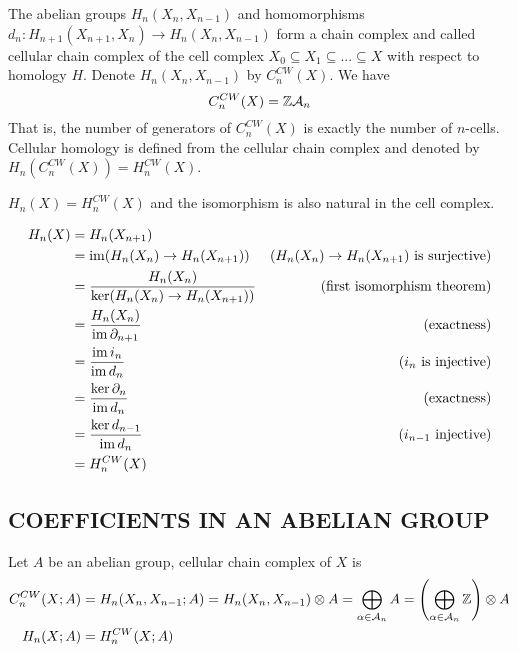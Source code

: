 \documentclass{report}
\begin{document}
\begin{definition}
    The abelian groups $H_n(X_n, X_{n-1})$ and homomorphisms $d_n: H_{n+1}(X_{n+1}, X_n) \to H_n(X_n, X_{n-1})$ form a chain complex and called cellular chain complex of the cell complex $X_0 \subseteq X_1 \subseteq ... \subseteq X$ with respect to homology $H$. Denote $H_n(X_n, X_{n-1})$ by $C^{CW}_n(X)$. We have
    $$
        C^{CW}_n(X) = \Z \mathcal{A}_n
    $$
    That is, the number of generators of $C^{CW}_n(X)$ is exactly the number of $n$-cells. Cellular homology is defined from the cellular chain complex and denoted by $H_n(C^{CW}_n(X)) = H^{CW}_n(X)$.
\end{definition}

\begin{theorem}
    $H_n(X) = H^{CW}_n(X)$ and the isomorphism is also natural in the cell complex.
\end{theorem}

\begin{longproof}
    \begin{align*}
        H_n(X)
        &= H_n(X_{n+1}) \\
        &= \im (H_n(X_n) \to H_n(X_{n+1})) &\text{($H_n(X_n) \to H_n(X_{n+1})$ is surjective)}\\
        &= \frac{H_n(X_n)}{\ker (H_n(X_n) \to H_n(X_{n+1}))} &\text{(first isomorphism theorem)} \\ 
        &= \frac{H_n(X_n)}{\im \partial_{n+1}} &\text{(exactness)} \\ 
        &= \frac{\im i_n}{\im d_n} &\text{($i_n$ is injective)} \\ 
        &= \frac{\ker \partial_n}{\im d_n} &\text{(exactness)} \\ 
        &= \frac{\ker d_{n-1}}{\im d_n} &\text{($i_{n-1}$ injective)} \\ 
        &= H^{CW}_n(X)
    \end{align*}
\end{longproof}

\begin{theorem}
\end{theorem}

\subsection{COEFFICIENTS IN AN ABELIAN GROUP}

\begin{definition}
    Let $A$ be an abelian group, cellular chain complex of $X$ is
    \begin{align*}
        C^{CW}_n(X; A) &= H_n(X_n, X_{n-1}; A) = H_n(X_n, X_{n-1}) \otimes A= \bigoplus_{\alpha \in \mathcal{A}_n} A = \tuple*{\bigoplus_{\alpha \in \mathcal{A}_n} \Z} \otimes A \\
        H_n(X; A) &= H^{CW}_n(X; A)
    \end{align*}
\end{definition}
\end{document}
